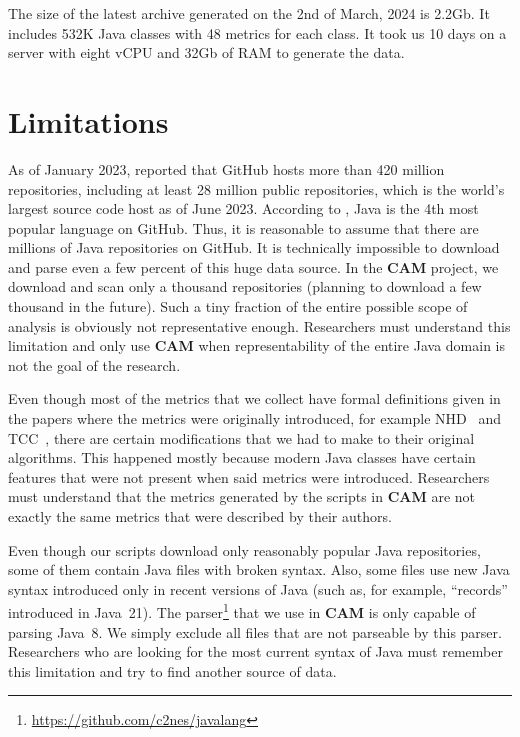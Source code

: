 \documentclass[11pt,sigplan,nonacm]{acmart}
\newcommand\cam{{\sffamily\bfseries CAM}}
\begin{document}
The size of the latest archive generated on the 2nd of March, 2024 is 2.2Gb. It includes 532K Java classes with 48 metrics for each class. It took us 10 days on a server with eight vCPU and 32Gb of RAM to generate the data.

\section{Limitations}

As of January 2023, \citet{dohmke2023} reported that GitHub hosts more than 420 million repositories, including at least 28 million public repositories, which is the world's largest source code host as of June 2023. According to \citep{daigle2023}, Java is the 4th most popular language on GitHub. Thus, it is reasonable to assume that there are millions of Java repositories on GitHub. It is technically impossible to download and parse even a few percent of this huge data source. In the \cam{} project, we download and scan only a thousand repositories (planning to download a few thousand in the future). Such a tiny fraction of the entire possible scope of analysis is obviously not representative enough. Researchers must understand this limitation and only use \cam{} when representability of the entire Java domain is not the goal of the research.

Even though most of the metrics that we collect have formal definitions given in the papers where the metrics were originally introduced, for example NHD~\citep{counsell2006interpretation} and TCC~\citep{bieman1995cohesion}, there are certain modifications that we had to make to their original algorithms. This happened mostly because modern Java classes have certain features that were not present when said metrics were introduced. Researchers must understand that the metrics generated by the scripts in \cam{} are not exactly the same metrics that were described by their authors.

Even though our scripts download only reasonably popular Java repositories, some of them contain Java files with broken syntax. Also, some files use new Java syntax introduced only in recent versions of Java (such as, for example, ``records'' introduced in Java~21). The parser\footnote{\url{https://github.com/c2nes/javalang}} that we use in \cam{} is only capable of parsing Java~8. We simply exclude all files that are not parseable by this parser. Researchers who are looking for the most current syntax of Java must remember this limitation and try to find another source of data.
\end{document}
